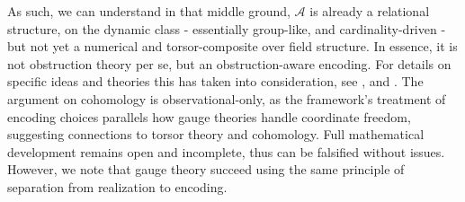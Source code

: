 As such, we can understand in that middle ground, $\mathcal{A}$ is already a relational structure, on the dynamic class - essentially group-like, and cardinality-driven - but not yet a numerical and torsor-composite over field structure. In essence, it is not obstruction theory per se, but an obstruction-aware encoding. For details on specific ideas and theories this has taken into consideration, see \cite{serre-galois-cohomology,skorobogatov-torsors,lang-tate-1958,borel-linear-algebraic-groups,giraud-cohomologie-nonabelienne,grothendieck-sga1,vistoli-descent-notes,milne-principal-homogeneous,kobayashi-nomizu,knapp-lie-groups,borovoi-2023-galois-cohomology}, and \cite{milne-etale-cohomology}. The argument on cohomology is observational-only, as the framework's treatment of encoding choices parallels how gauge theories handle coordinate freedom, suggesting connections to torsor theory and cohomology. Full mathematical development remains open and incomplete, thus can be falsified without issues. However, we note that gauge theory succeed using the same principle of separation from realization to encoding.  
\vspace{1mm}

